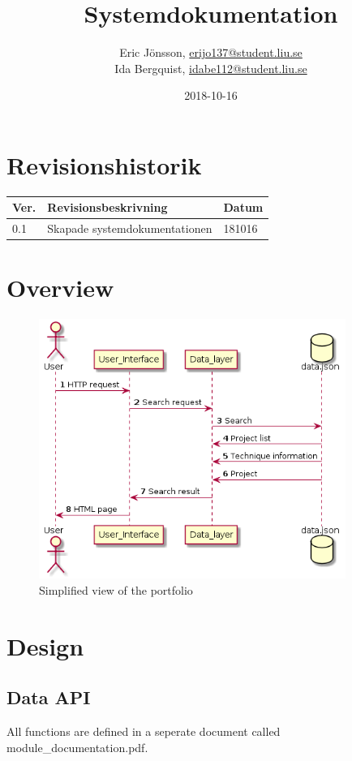 \documentclass{TDP003mall}
\author{Eric Jönsson, \url{erijo137@student.liu.se}\\
  Ida Bergquist, \url{idabe112@student.liu.se}}
\title{Systemdokumentation}
\date{2018-10-16}
\begin{document}
\projectpage
\tableofcontents
\newpage
\section{Revisionshistorik}
\begin{table}[!h]
\begin{tabularx}{\linewidth}{|l|X|l|}
\hline
\textbf{Ver.} & \textbf{Revisionsbeskrivning} & \textbf{Datum} \\\hline
0.1 & Skapade systemdokumentationen & 181016 \\\hline
\end{tabularx}
\end{table}

\section{Overview}
\begin{figure}[h!]
    \centering
    \includegraphics[width=10cm]{sevenskdiagram.png}
    \caption{Simplified view of the portfolio}
    \label{sekvensdiagram}
\end{figure}

\section{Design}
\subsection{Data API}
All functions are defined in a seperate document called module\_documentation.pdf.
\end{document}
